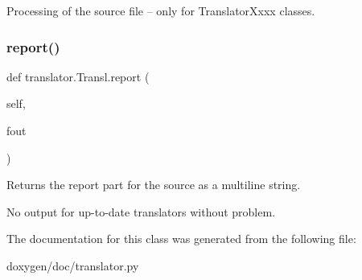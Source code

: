 \begin{DoxyVerb}Processing of the source file -- only for TranslatorXxxx classes.\end{DoxyVerb}
 \mbox{\label{classtranslator_1_1_transl_a70179583414dbb92f9875af3ae2ee5ba}} 
\subsubsection{\texorpdfstring{report()}{report()}}
{\footnotesize\ttfamily def translator.\+Transl.\+report (\begin{DoxyParamCaption}\item[{}]{self,  }\item[{}]{fout }\end{DoxyParamCaption})}

\begin{DoxyVerb}Returns the report part for the source as a multiline string.

No output for up-to-date translators without problem.\end{DoxyVerb}
 

The documentation for this class was generated from the following file\+:\begin{DoxyCompactItemize}
\item 
doxygen/doc/translator.\+py\end{DoxyCompactItemize}
